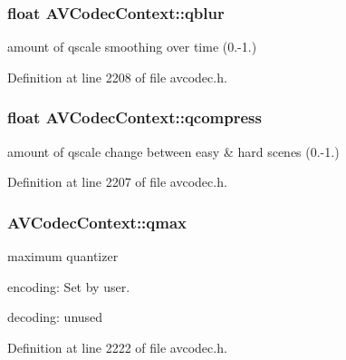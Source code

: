 \subsubsection[{\texorpdfstring{qblur}{qblur}}]{\setlength{\rightskip}{0pt plus 5cm}float A\+V\+Codec\+Context\+::qblur}\hypertarget{struct_a_v_codec_context_acf7ff44bfb16c8f4da1e7c1567964074}{}\label{struct_a_v_codec_context_acf7ff44bfb16c8f4da1e7c1567964074}


amount of qscale smoothing over time (0.-\/1.) 



Definition at line 2208 of file avcodec.\+h.

\subsubsection[{\texorpdfstring{qcompress}{qcompress}}]{\setlength{\rightskip}{0pt plus 5cm}float A\+V\+Codec\+Context\+::qcompress}\hypertarget{struct_a_v_codec_context_acf47505d34bd4b5a9292268f9aed1faa}{}\label{struct_a_v_codec_context_acf47505d34bd4b5a9292268f9aed1faa}


amount of qscale change between easy \& hard scenes (0.-\/1.) 



Definition at line 2207 of file avcodec.\+h.

\subsubsection[{\texorpdfstring{qmax}{qmax}}]{ A\+V\+Codec\+Context\+::qmax}\hypertarget{struct_a_v_codec_context_ab015db3b7fcd227193a7c17283914187}{}\label{struct_a_v_codec_context_ab015db3b7fcd227193a7c17283914187}
maximum quantizer
\begin{DoxyItemize}
\item encoding\+: Set by user.
\item decoding\+: unused 
\end{DoxyItemize}

Definition at line 2222 of file avcodec.\+h.

